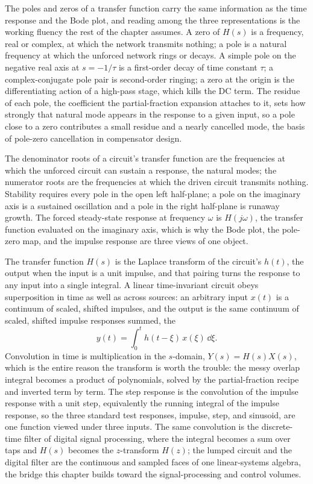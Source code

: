 The poles and zeros of a transfer function carry the same information as
the time response and the Bode plot, and reading among the three
representations is the working fluency the rest of the chapter assumes. A
zero of $H(s)$ is a frequency, real or complex, at which the network
transmits nothing; a pole is a natural frequency at which the unforced
network rings or decays. A simple pole on the negative real axis at
$s = -1/\tau$ is a first-order decay of time constant $\tau$; a
complex-conjugate pole pair is second-order ringing; a zero at the origin
is the differentiating action of a high-pass stage, which kills the DC
term. The residue of each pole, the coefficient the partial-fraction
expansion attaches to it, sets how strongly that natural mode appears in
the response to a given input, so a pole close to a zero contributes a
small residue and a nearly cancelled mode, the basis of pole-zero
cancellation in compensator design.

\begin{principle}
The denominator roots of a circuit's transfer function are the
frequencies at which the unforced circuit can sustain a response, the
natural modes; the numerator roots are the frequencies at which the
driven circuit transmits nothing. Stability requires every pole in the
open left half-plane; a pole on the imaginary axis is a sustained
oscillation and a pole in the right half-plane is runaway growth. The
forced steady-state response at frequency $\omega$ is $H(j\omega)$, the
transfer function evaluated on the imaginary axis, which is why the Bode
plot, the pole-zero map, and the impulse response are three views of one
object.
\end{principle}

\begin{mastery}
The transfer function $H(s)$ is the Laplace transform of the circuit's
 $h(t)$, the output when the input is a unit
impulse, and that pairing turns the response to any input into a single
integral. A linear time-invariant circuit obeys superposition in time as
well as across sources: an arbitrary input $x(t)$ is a continuum of
scaled, shifted impulses, and the output is the same continuum of scaled,
shifted impulse responses summed, the 
\[
y(t) = \int_0^{t} h(t - \xi)\,x(\xi)\,\dd\xi.
\]
Convolution in time is multiplication in the $s$-domain, $Y(s) = H(s)X(s)$,
which is the entire reason the transform is worth the trouble: the messy
overlap integral becomes a product of polynomials, solved by the
partial-fraction recipe and inverted term by term. The step response is
the convolution of the impulse response with a unit step, equivalently the
running integral of the impulse response, so the three standard test
responses, impulse, step, and sinusoid, are one function viewed under
three inputs. The same convolution is the discrete-time filter of digital
signal processing, where the integral becomes a sum over taps and $H(s)$
becomes the $z$-transform $H(z)$; the lumped circuit and the digital
filter are the continuous and sampled faces of one linear-systems
algebra, the bridge this chapter builds toward the signal-processing and
control volumes.
\end{mastery}


